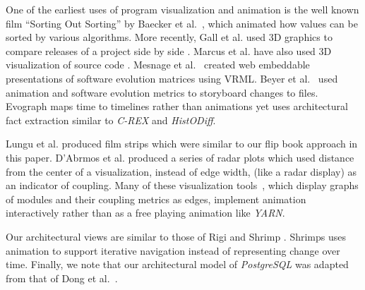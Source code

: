 \documentclass[times, 10pt,twocolumn]{article}
\newcommand{\histodiff}{\emph{HistODiff}\xspace}
\newcommand{\crex}{\emph{C-REX}\xspace}
\newcommand{\yarn}{\emph{YARN\xspace}}
\newcommand{\postgresql}{\emph{PostgreSQL}\xspace}
\newcommand{\shtn}{\vspace*{-.5em}}
\begin{document}
\shtn
{}
\shtn

One of the earliest uses of program visualization and animation is the
well known film ``Sorting Out Sorting'' by Baecker et
al.~\cite{sortingout}, which animated how values can be sorted by
various algorithms.  More recently, Gall et al. used 3D graphics to
compare releases of a project side by side \cite{GallJR99}.  Marcus et
al. have also used 3D visualization of source code \cite{maletic}.
Mesnage et al.~\cite{DBLP:conf/vissoft/MesnageL05} created web
embeddable presentations of software evolution matrices using VRML.
Beyer et al.~\cite{storyboard} used animation and software evolution
metrics to storyboard changes to files. Evograph maps time to
timelines rather than animations \cite{DBLP:conf/wcre/FischerG06} yet
uses architectural fact extraction similar to \crex and
\histodiff.

Lungu et al. \cite{lungu} produced film strips which were similar to
our flip book approach in this paper.  D'Abrmos et al.
\cite{DBLP:conf/wcre/DAmbrosL06} produced a series of radar plots
which used distance from the center of a visualization, instead of
edge width, (like a radar display) as an indicator of coupling. Many
of these visualization
tools~\cite{lungu,DBLP:conf/wcre/DAmbrosL06,pinzger-softvis05,ratzinger-iwpse05,DBLP:conf/vissoft/TeleaV05},
which display graphs of modules and their coupling metrics as edges,
implement animation interactively rather than as a free
playing animation like \yarn.




Our architectural views are similar to those of Rigi \cite{rigi} and
Shrimp \cite{shrimp}. Shrimps uses animation to support iterative
navigation instead of representing change over time.  
Finally, we note that 
our architectural model of \postgresql was adapted from that of
Dong et al.~\cite{dong}.
\end{document}
